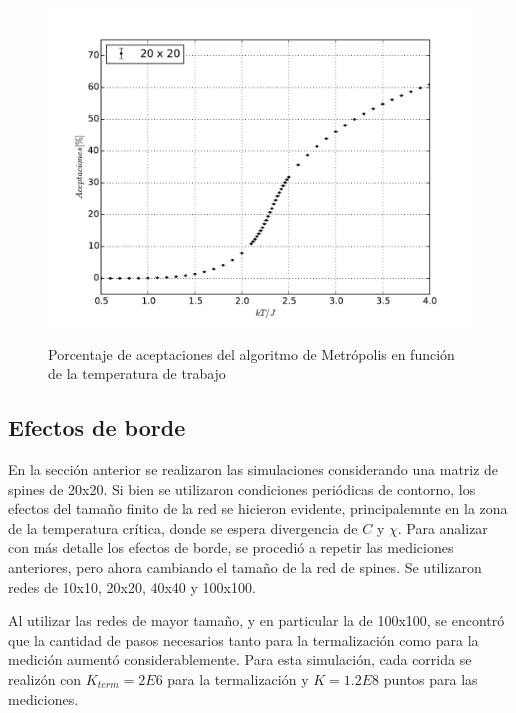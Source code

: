 \documentclass[a4paper,12pt]{article}
\begin{document}
\begin{figure}[H]
    \begin{center}
      \includegraphics[scale=0.5]{aceptaciones.pdf} \\
      \caption{Porcentaje de aceptaciones del algoritmo de Metrópolis en 
      función de la temperatura de trabajo}\label{fig:aceptaciones}
    \end{center}
\end{figure}

\subsection{Efectos de borde}

En la sección anterior se realizaron las simulaciones considerando una matriz 
de spines de 20x20. Si bien se utilizaron condiciones periódicas de contorno, 
los efectos del tamaño finito de la red se hicieron evidente, principalemnte en 
la zona de la temperatura crítica, donde se espera divergencia de $C$ y $\chi$. 
Para analizar con más detalle los efectos de borde, se procedió a repetir las 
mediciones anteriores, pero ahora cambiando el tamaño de la red de spines. Se 
utilizaron redes de 10x10, 20x20, 40x40 y 100x100.

Al utilizar las redes de mayor tamaño, y en particular la de 100x100, se 
encontró que la cantidad de pasos necesarios tanto para la termalización como 
para la medición aumentó considerablemente. Para esta simulación, cada corrida 
se realizón con $K_{term}=2E6$ para la termalización y $K=1.2E8$ puntos para 
las mediciones.
\end{document}
